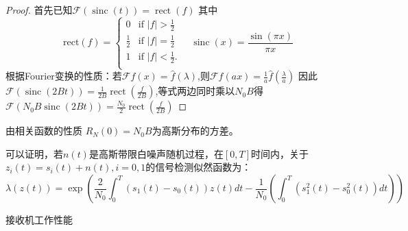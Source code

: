 \documentclass{article}
\DeclareMathOperator{\sinc}{sinc}
\DeclareMathOperator{\rect}{rect}
\begin{document}
\begin{enumerate}
\begin{proof}
首先已知$\mathcal{F}(\sinc(t))=\rect(f)$
其中
$$
{\displaystyle \mathrm {rect} (f)={\begin{cases}0&{\mbox{if }}|f|>{\frac {1}{2}}\\{\frac {1}{2}}&{\mbox{if }}|f|={\frac {1}{2}}\\1&{\mbox{if }}|f|<{\frac {1}{2}}.\\\end{cases}}\quad\sinc(x)=\frac{\sin(\pi x)}{\pi x}}
$$
根据Fourier变换的性质：若$\mathcal{F} f(x)=\hat{f}(\lambda)$,则$\mathcal{F}f(ax)=\frac{1}{a}\hat{f}(\frac{\lambda}{a})$
因此$\mathcal{F}(\sinc(2Bt))=\frac{1}{2B}\rect(\frac{f}{2B})$,等式两边同时乘以$N_0B$得
$\mathcal{F}(N_0B\sinc(2Bt))=\frac{N_0}{2}\rect(\frac{f}{2B})$
\end{proof}
由相关函数的性质
$R_N(0)=N_0B$为高斯分布的方差。

可以证明，若$n(t)$是高斯带限白噪声随机过程，在$[0,T]$时间内，关于$z_i(t)=s_i(t)+n(t),i=0,1$的信号检测似然函数为：
\begin{equation}
\lambda(z(t))=\exp\left(\frac{2}{N_0}\int_0^T (s_1(t)-s_0(t))z(t)dt -\frac{1}{N_0}(\int_0^T (s_1^2(t)-s_0^2(t))dt)\right)
\end{equation}

接收机工作性能


\end{enumerate}
\end{document}
